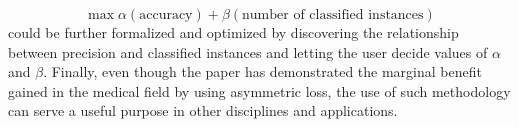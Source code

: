  \begin{equation}
 \max \alpha(\text{accuracy}) + \beta(\text{number of classified instances})
 \end{equation}
could be further formalized and optimized by discovering the relationship between precision and classified instances and letting the user decide values of $\alpha$ and $\beta$. Finally, even though the paper has demonstrated the marginal benefit gained in the medical field by using asymmetric loss, the use of such methodology can serve a useful purpose in other disciplines and applications.



